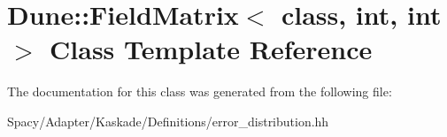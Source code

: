 \hypertarget{classDune_1_1FieldMatrix}{}\section{Dune\+:\+:Field\+Matrix$<$ class, int, int $>$ Class Template Reference}
\label{classDune_1_1FieldMatrix}


The documentation for this class was generated from the following file\+:\begin{DoxyCompactItemize}
\item 
Spacy/\+Adapter/\+Kaskade/\+Definitions/error\+\_\+distribution.\+hh\end{DoxyCompactItemize}
